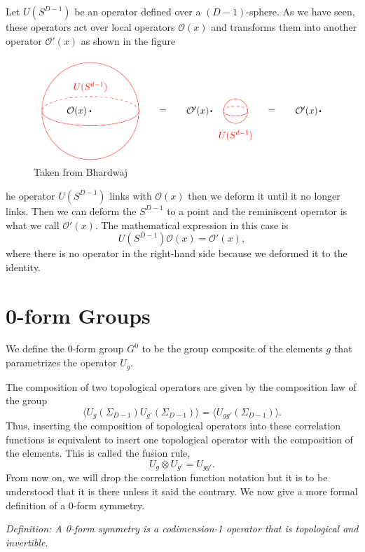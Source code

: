 \documentclass{article}
\begin{document}
Let   $U(S^{D-1})$ be an operator defined over a $(D-1)$-sphere.  As we have seen, these operators act over local operators $\mathcal{O}(x)$ and transforms them into another operator $\mathcal{O}'(x)$  as shown in the figure
\begin{figure}[h]
\centering
\includegraphics[scale=0.4]{figures/linking.png}
\caption{Taken from Bhardwaj}
\end{figure}
he operator $U(S^{D-1})$ links with $\mathcal{O}(x)$ then we deform it until it no longer links. Then we can deform the $S^{D-1}$ to a point and the reminiscent operator is what we call $\mathcal{O}'(x).$ The mathematical expression in this case is 
$$
U(S^{D-1})\mathcal{O}(x)=\mathcal{O}'(x),
$$
where there is no operator in the right-hand side because we deformed it to the identity. 
\section*{0-form Groups}
We define the 0-form group $G^{0}$ to be the group composite of the elements $g$ that parametrizes the operator $U_g.$

The composition of two topological operators are given by the composition law of the group
$$\langle U_g(\Sigma_{D-1})U_{g'}(\Sigma_{D-1})\rangle=\langle U_{gg'}(\Sigma_{D-1})\rangle.$$
Thus, inserting the composition of topological operators into these correlation functions is equivalent to insert one topological operator with the composition of the elements. This is called the fusion rule,
$$
U_g\otimes U_{g'}=U_{gg'}.
$$
From now on, we will drop the correlation function notation but it is to be understood that it is there unless it said the contrary.  We now give a more formal definition of a 0-form symmetry. 

\textit{Definition: A 0-form symmetry is a codimension-1 operator that is topological and invertible. }
\end{document}
